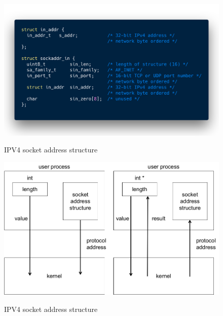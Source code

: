   \begin{figure}
  \centering
  \includegraphics[width=.8\textwidth]{code/02code01.png}\\
  \caption{IPV4 socket address structure}
  \label{1}
  \end{figure}

  \begin{figure}
  \centering
  \includegraphics[width=.8\textwidth]{fig/02fig01.png}\\
  \caption{IPV4 socket address structure}
  \label{1}
  \end{figure}
